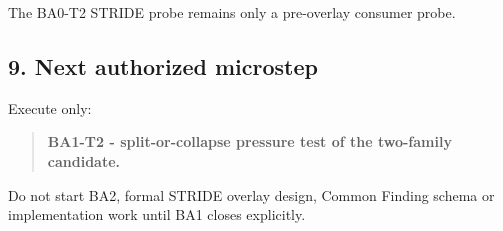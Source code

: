 \documentclass[
]{article}
\begin{document}
The BA0-T2 STRIDE probe remains only a pre-overlay consumer probe.

\subsection{9. Next authorized
microstep}\label{9-next-authorized-microstep}

Execute only:

\begin{quote}
\textbf{BA1-T2 - split-or-collapse pressure test of the two-family
candidate.}
\end{quote}

Do not start BA2, formal STRIDE overlay design, Common Finding schema or
implementation work until BA1 closes explicitly.
\end{document}
